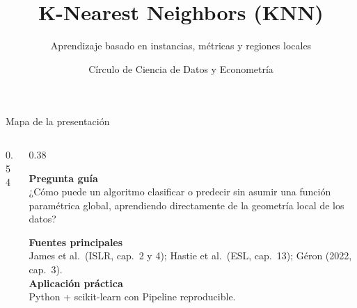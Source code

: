 \documentclass[aspectratio=169,11pt,table]{beamer}
\title{K-Nearest Neighbors (KNN)}
\subtitle{Aprendizaje basado en instancias, métricas y regiones locales}
\author{Círculo de Ciencia de Datos y Econometría}
\date{}
\begin{document}


\begin{frame}{Mapa de la presentación}
\vspace{-0.08cm}
\begin{columns}[T,onlytextwidth]
\begin{column}{0.54\textwidth}
{\footnotesize\tableofcontents}
\end{column}
\hfill
\begin{column}{0.38\textwidth}
\begin{keybox}[left=2mm,right=2mm,top=1.2mm,bottom=1.2mm,fontupper=\footnotesize\RaggedRight]
\textbf{Pregunta guía}\\[0.10cm]
¿Cómo puede un algoritmo clasificar o predecir sin asumir una función paramétrica global, aprendiendo directamente de la geometría local de los datos?
\end{keybox}
\vspace{0.12cm}
\begin{ccdebox}[left=2mm,right=2mm,top=1.2mm,bottom=1.2mm]
\footnotesize\RaggedRight
\textbf{Fuentes principales}\\
{\scriptsize James et al.\ (ISLR, cap.\ 2 y 4); Hastie et al.\ (ESL, cap.\ 13); Géron (2022, cap.\ 3).}\\[0.08cm]
\textbf{Aplicación práctica}\\
{\scriptsize Python + scikit-learn con Pipeline reproducible.}
\end{ccdebox}
\end{column}
\end{columns}
\vspace{0.06cm}
\end{frame}








\end{document}
